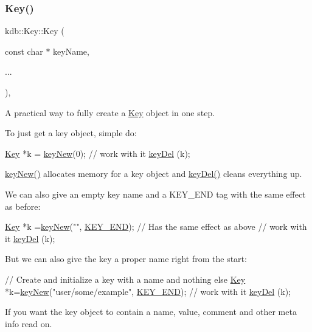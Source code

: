 \subsubsection{\texorpdfstring{Key()}{Key()}\hspace{0.1cm}{\footnotesize\ttfamily [5/7]}}
{\footnotesize\ttfamily kdb\+::\+Key\+::\+Key (\begin{DoxyParamCaption}\item[{const char $\ast$}]{key\+Name,  }\item[{}]{... }\end{DoxyParamCaption})\hspace{0.3cm}{\ttfamily [inline]}, {\ttfamily [explicit]}}



A practical way to fully create a \hyperlink{classkdb_1_1Key}{Key} object in one step. 

To just get a key object, simple do\+:


\begin{DoxyCodeInclude}
\hyperlink{classkdb_1_1Key_a5679f5cae63caddd64a60388b9cc77fa}{Key} *k = \hyperlink{group__key_gad23c65b44bf48d773759e1f9a4d43b89}{keyNew}(0);
\textcolor{comment}{// work with it}
\hyperlink{group__key_ga3df95bbc2494e3e6703ece5639be5bb1}{keyDel} (k);
\end{DoxyCodeInclude}
 \hyperlink{group__key_gad23c65b44bf48d773759e1f9a4d43b89}{key\+New()} allocates memory for a key object and \hyperlink{group__key_ga3df95bbc2494e3e6703ece5639be5bb1}{key\+Del()} cleans everything up.

We can also give an empty key name and a K\+E\+Y\+\_\+\+E\+ND tag with the same effect as before\+:


\begin{DoxyCodeInclude}
\hyperlink{classkdb_1_1Key_a5679f5cae63caddd64a60388b9cc77fa}{Key} *k =\hyperlink{group__key_gad23c65b44bf48d773759e1f9a4d43b89}{keyNew}(\textcolor{stringliteral}{""}, \hyperlink{group__key_gga91fb3178848bd682000958089abbaf40aa8adb6fcb92dec58fb19410eacfdd403}{KEY\_END}); \textcolor{comment}{// Has the same effect as above}
\textcolor{comment}{// work with it}
\hyperlink{group__key_ga3df95bbc2494e3e6703ece5639be5bb1}{keyDel} (k);
\end{DoxyCodeInclude}
 But we can also give the key a proper name right from the start\+:


\begin{DoxyCodeInclude}
\textcolor{comment}{// Create and initialize a key with a name and nothing else}
\hyperlink{classkdb_1_1Key_a5679f5cae63caddd64a60388b9cc77fa}{Key} *k=\hyperlink{group__key_gad23c65b44bf48d773759e1f9a4d43b89}{keyNew}(\textcolor{stringliteral}{"user/some/example"}, \hyperlink{group__key_gga91fb3178848bd682000958089abbaf40aa8adb6fcb92dec58fb19410eacfdd403}{KEY\_END});
\textcolor{comment}{// work with it}
\hyperlink{group__key_ga3df95bbc2494e3e6703ece5639be5bb1}{keyDel} (k);
\end{DoxyCodeInclude}
 If you want the key object to contain a name, value, comment and other meta info read on.

